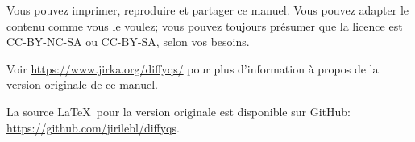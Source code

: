 \documentclass[12pt]{book}
\begin{document}
\begin{small}
\bigskip

\noindent
Vous pouvez imprimer, reproduire et partager ce manuel.  Vous pouvez adapter le contenu comme vous le voulez; vous pouvez toujours présumer que la licence est
CC-BY-NC-SA ou CC-BY-SA\@,
selon vos besoins.

\bigskip

\noindent

\bigskip

\noindent

\bigskip

\noindent
Voir \url{https://www.jirka.org/diffyqs/} pour plus d'information à propos de la version originale de ce manuel.

\bigskip

\noindent
La source  \LaTeX\ pour la version originale est disponible sur GitHub:  \url{https://github.com/jirilebl/diffyqs}.
\end{small}

\diffytableofcontents

\newpage


\end{document}
